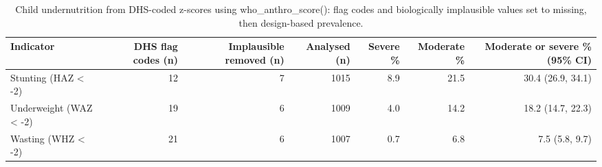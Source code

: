 \begin{table}

\caption{\label{tab:tab_anthropometry}Child undernutrition from DHS-coded z-scores using who\_anthro\_score(): flag codes and biologically implausible values set to missing, then design-based prevalence.}
\centering
\begin{tabular}[t]{lrrrrrr}
\toprule
Indicator & DHS flag codes (n) & Implausible removed (n) & Analysed (n) & Severe \% & Moderate \% & Moderate or severe \% (95\% CI)\\
\midrule
Stunting (HAZ < -2) & 12 & 7 & 1015 & 8.9 & 21.5 & 30.4 (26.9, 34.1)\\
Underweight (WAZ < -2) & 19 & 6 & 1009 & 4.0 & 14.2 & 18.2 (14.7, 22.3)\\
Wasting (WHZ < -2) & 21 & 6 & 1007 & 0.7 & 6.8 & 7.5 (5.8, 9.7)\\
\bottomrule
\end{tabular}
\end{table}
